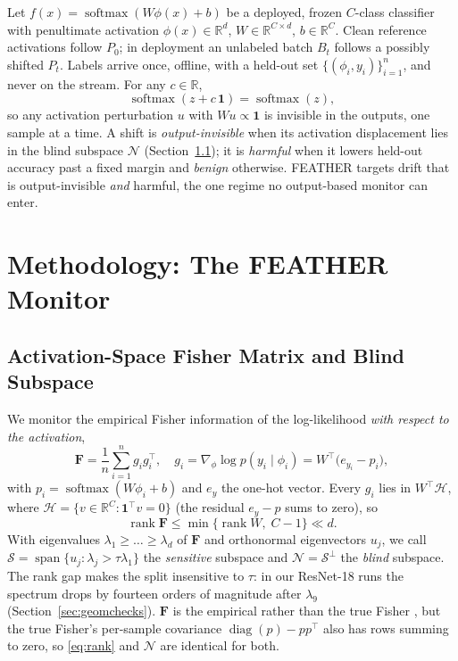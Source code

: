 \documentclass[conference]{IEEEtran}
\newcommand{\R}{\mathbb{R}}
\newcommand{\F}{\mathbf{F}}
\newcommand{\act}{\phi}
\DeclareMathOperator{\rank}{rank}
\DeclareMathOperator{\diag}{diag}
\DeclareMathOperator{\spn}{span}
\DeclareMathOperator*{\softmax}{softmax}
\begin{document}
Let $f(x) = \softmax(W\act(x) + b)$ be a deployed, frozen $C$-class
classifier with penultimate activation $\act(x) \in \R^d$,
$W \in \R^{C \times d}$, $b \in \R^C$. Clean reference activations follow
$P_0$; in deployment an unlabeled batch $B_t$ follows a possibly shifted
$P_t$. Labels arrive once, offline, with a held-out set
$\{(\act_i, y_i)\}_{i=1}^{n}$, and never on the stream. For any $c \in \R$,
\begin{equation}
  \softmax(z + c\,\mathbf{1}) = \softmax(z),
  \label{eq:invariance}
\end{equation}
so any activation perturbation $u$ with $Wu \propto \mathbf{1}$ is invisible
in the outputs, one sample at a time. A shift is \emph{output-invisible} when
its activation displacement lies in the blind subspace $\mathcal{N}$
(Section~\ref{sec:blind}); it is \emph{harmful} when it lowers held-out
accuracy past a fixed margin and \emph{benign} otherwise. FEATHER targets drift
that is output-invisible \emph{and} harmful, the one regime no output-based
monitor can enter.

\section{Methodology: The FEATHER Monitor}
\label{sec:method}

\subsection{Activation-Space Fisher Matrix and Blind Subspace}
\label{sec:blind}

We monitor the empirical Fisher information of the log-likelihood \emph{with
respect to the activation},
\begin{equation}
  \F = \frac{1}{n}\sum_{i=1}^{n} g_i g_i^\top,
  \quad
  g_i = \nabla_{\act}\log p(y_i \mid \act_i) = W^\top\!\big(e_{y_i} - p_i\big),
  \label{eq:fisher}
\end{equation}
with $p_i = \softmax(W\act_i + b)$ and $e_y$ the one-hot vector. Every $g_i$
lies in $W^\top\!\mathcal{H}$, where
$\mathcal{H} = \{v \in \R^C : \mathbf{1}^\top v = 0\}$ (the residual
$e_y - p$ sums to zero), so
\begin{equation}
  \rank \F \le \min\{\rank W,\; C-1\} \ll d .
  \label{eq:rank}
\end{equation}
With eigenvalues $\lambda_1 \ge \dots \ge \lambda_d$ of $\F$ and orthonormal
eigenvectors $u_j$, we call $\mathcal{S} = \spn\{u_j : \lambda_j >
\tau\lambda_1\}$ the \emph{sensitive} subspace and $\mathcal{N} =
\mathcal{S}^\perp$ the \emph{blind} subspace. The rank gap makes the split
insensitive to $\tau$: in our ResNet-18 runs the spectrum drops by fourteen
orders of magnitude after $\lambda_9$ (Section~\ref{sec:geomchecks}). $\F$ is
the empirical rather than the true Fisher \cite{kunstner2019empirical}, but the
true Fisher's per-sample covariance $\diag(p) - pp^\top$ also has rows summing
to zero, so \eqref{eq:rank} and $\mathcal{N}$ are identical for both.
\end{document}
